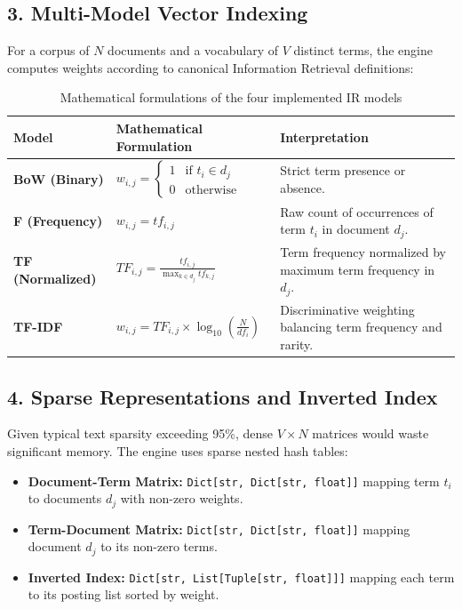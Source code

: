 \documentclass[11pt,a4paper]{article}
\begin{document}
\subsection{3. Multi-Model Vector Indexing}
For a corpus of $N$ documents and a vocabulary of $V$ distinct terms, the engine computes weights according to canonical Information Retrieval definitions:

\begin{table}[htbp]
\centering
\small
\begin{tabular}{lll}
\toprule
\textbf{Model} & \textbf{Mathematical Formulation} & \textbf{Interpretation} \\
\midrule
\textbf{BoW (Binary)} & $w_{i,j} = \begin{cases} 1 & \text{if } t_i \in d_j \\ 0 & \text{otherwise} \end{cases}$ & Strict term presence or absence. \\
\addlinespace
\textbf{F (Frequency)} & $w_{i,j} = tf_{i,j}$ & Raw count of occurrences of term $t_i$ in document $d_j$. \\
\addlinespace
\textbf{TF (Normalized)} & $TF_{i,j} = \frac{tf_{i,j}}{\max_{k \in d_j} tf_{k,j}}$ & Term frequency normalized by maximum term frequency in $d_j$. \\
\addlinespace
\textbf{TF-IDF} & $w_{i,j} = TF_{i,j} \times \log_{10}\left(\frac{N}{df_i}\right)$ & Discriminative weighting balancing term frequency and rarity. \\
\bottomrule
\end{tabular}
\caption{Mathematical formulations of the four implemented IR models}
\label{tab:model_formulas}
\end{table}

\subsection{4. Sparse Representations and Inverted Index}
Given typical text sparsity exceeding 95\%, dense $V \times N$ matrices would waste significant memory. The engine uses sparse nested hash tables:
\begin{itemize}
    \item \textbf{Document-Term Matrix:} \texttt{Dict[str, Dict[str, float]]} mapping term $t_i$ to documents $d_j$ with non-zero weights.
    \item \textbf{Term-Document Matrix:} \texttt{Dict[str, Dict[str, float]]} mapping document $d_j$ to its non-zero terms.
    \item \textbf{Inverted Index:} \texttt{Dict[str, List[Tuple[str, float]]]} mapping each term to its posting list sorted by weight.
\end{itemize}
\end{document}
